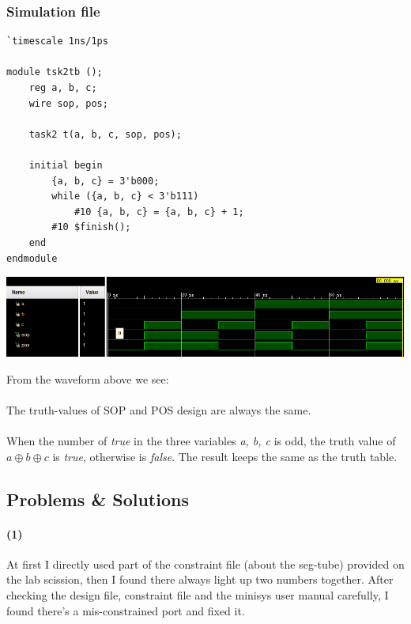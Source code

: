 \documentclass[onecolumn, oneside, ctexart]{SUSTechHomework}
\begin{document}
\subsubsection*{Simulation file}
\begin{lstlisting}
`timescale 1ns/1ps

module tsk2tb ();
    reg a, b, c;
    wire sop, pos;

    task2 t(a, b, c, sop, pos);

    initial begin
        {a, b, c} = 3'b000;
        while ({a, b, c} < 3'b111)
            #10 {a, b, c} = {a, b, c} + 1;
        #10 $finish();
    end
endmodule
\end{lstlisting}
\vspace{-1.5em}
\centerline{\includegraphics[width=\textwidth]{t2/tsk2}}
\par From the waveform above we see:
\vspace{-1em}
\paragraph{} The truth-values of SOP and POS design are always the same.
\vspace{-1em}
\paragraph{} When the number of \emph{true} in the three variables \textit{a, b, c} is odd, the truth value of $a\oplus b\oplus c$ is \emph{true}, otherwise is \emph{false}. The result keeps the same as the truth table.

\subsection{Problems \& Solutions}
\paragraph{(1)} At first I directly used part of the constraint file (about the seg-tube) provided on the lab scission, then I found there always light up two numbers together. After checking the design file, constraint file and the minisys user manual carefully, I found there's a mis-constrained port and fixed it.
\vspace{-1em}
\end{document}
